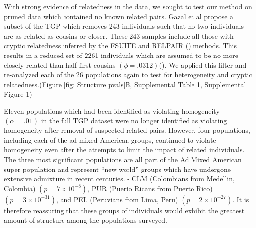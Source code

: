 With strong evidence of relatedness in the data, we sought to test
our method on pruned data which contained no known related pairs.
Gazal et al propose a subset of the TGP which removes 243 individuals
such that no two individuals are as related as cousins or closer.
These 243 samples include all those with cryptic relatedness inferred
by the FSUITE and RELPAIR (\citealp{boehnke1997accurate,epstein2000improved})
methods. This results in a reduced set of 2261 individuals which are
assumed to be no more closely related than half first cousins $\left(\phi=.0312\right)$(\citealp{gazal2015high}).
We applied this filter and re-analyzed each of the 26 populations
again to test for heterogeneity and cryptic relatedness.(Figure \ref{fig: Structure pvals}B,
Supplemental Table 1, Supplemental Figure 1)

Eleven populations which had been identified as violating homogeneity
$\left(\alpha=.01\right)$ in the full TGP dataset were no longer
identified as violating homogeneity after removal of suspected related
pairs. However, four populations, including each of the ad-mixed American
groups, continued to violate homogeneity even after the attempts to
limit the impact of related individuals. The three most significant
populations are all part of the Ad Mixed American super population
and represent ``new world'' groups which have undergone extensive
admixture in recent centuries. - CLM (Colombians from Medellin, Colombia) $\left(p=7\times10^{-8}\right)$,
PUR (Puerto Ricans from Puerto Rico) $\left(p=3\times10^{-31}\right)$,
and PEL (Peruvians from Lima, Peru) $\left(p=2\times10^{-27}\right)$.
It is therefore reassuring that these groups of individuals would
exhibit the greatest amount of structure among the populations surveyed. 

